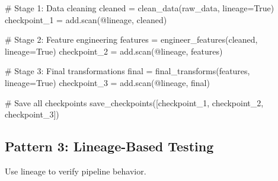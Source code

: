 \documentclass[
  letterpaper,
]{scrbook}
\newenvironment{Shaded}{\begin{snugshade}}{\end{snugshade}}
\newcommand{\CommentTok}[1]{\textcolor[rgb]{0.37,0.37,0.37}{#1}}
\newcommand{\NormalTok}[1]{\textcolor[rgb]{0.00,0.23,0.31}{#1}}
\newcommand{\OperatorTok}[1]{\textcolor[rgb]{0.37,0.37,0.37}{#1}}
\newcommand{\StringTok}[1]{\textcolor[rgb]{0.13,0.47,0.30}{#1}}
\newcommand{\VariableTok}[1]{\textcolor[rgb]{0.07,0.07,0.07}{#1}}
\begin{document}
\begin{Shaded}
\begin{Highlighting}[]
\CommentTok{\# Stage 1: Data cleaning}
\NormalTok{cleaned }\OperatorTok{=}\NormalTok{ clean\_data(raw\_data, lineage}\OperatorTok{=}\VariableTok{True}\NormalTok{)}
\NormalTok{checkpoint\_1 }\OperatorTok{=}\NormalTok{ add.scan(}\StringTok{\textquotesingle{}@lineage\textquotesingle{}}\NormalTok{, cleaned)}

\CommentTok{\# Stage 2: Feature engineering}
\NormalTok{features }\OperatorTok{=}\NormalTok{ engineer\_features(cleaned, lineage}\OperatorTok{=}\VariableTok{True}\NormalTok{)}
\NormalTok{checkpoint\_2 }\OperatorTok{=}\NormalTok{ add.scan(}\StringTok{\textquotesingle{}@lineage\textquotesingle{}}\NormalTok{, features)}

\CommentTok{\# Stage 3: Final transformations}
\NormalTok{final }\OperatorTok{=}\NormalTok{ final\_transforms(features, lineage}\OperatorTok{=}\VariableTok{True}\NormalTok{)}
\NormalTok{checkpoint\_3 }\OperatorTok{=}\NormalTok{ add.scan(}\StringTok{\textquotesingle{}@lineage\textquotesingle{}}\NormalTok{, final)}

\CommentTok{\# Save all checkpoints}
\NormalTok{save\_checkpoints([checkpoint\_1, checkpoint\_2, checkpoint\_3])}
\end{Highlighting}
\end{Shaded}

\subsection{Pattern 3: Lineage-Based
Testing}\label{pattern-3-lineage-based-testing}

Use lineage to verify pipeline behavior.
\end{document}
